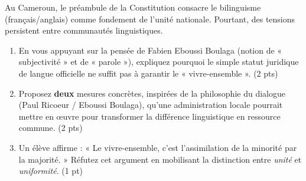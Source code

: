 \documentclass[11pt]{article}
\begin{document}
\begin{exercice}
Au Cameroun, le préambule de la Constitution consacre le bilinguisme (français/anglais) comme fondement de l'unité nationale. Pourtant, des tensions persistent entre communautés linguistiques.
\begin{enumerate}
\item En vous appuyant sur la pensée de Fabien Eboussi Boulaga (notion de « subjectivité » et de « parole »), expliquez pourquoi le simple statut juridique de langue officielle ne suffit pas à garantir le « vivre-ensemble ». \hfill (2 pts)
\item Proposez \textbf{deux} mesures concrètes, inspirées de la philosophie du dialogue (Paul Ricoeur / Eboussi Boulaga), qu'une administration locale pourrait mettre en œuvre pour transformer la différence linguistique en ressource commune. \hfill (2 pts)
\item Un élève affirme : « Le vivre-ensemble, c'est l'assimilation de la minorité par la majorité. » Réfutez cet argument en mobilisant la distinction entre \textit{unité} et \textit{uniformité}. \hfill (1 pt)
\end{enumerate}
\end{exercice}
\end{document}
